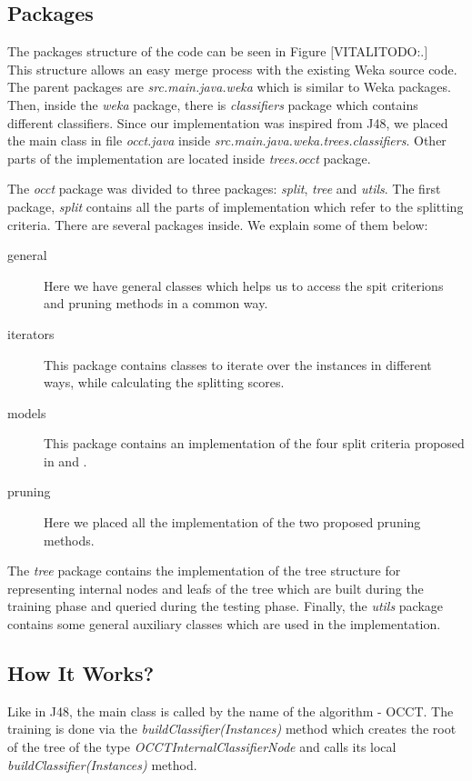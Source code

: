 \documentclass[a4paper,12pt]{article}
\newcommand{\commenter}[3]{$[$\uppercase{#1}#2:#3$]$  \\}
\newcommand{\vitali}[2]{\commenter{vitali}{#1}{#2}}
\begin{document}
\begin{spacing}{1.5}
\subsection{Packages}
The packages structure of the code can be seen in Figure \vitali{TODO}. This structure allows an easy merge process with the existing Weka source code. The parent packages are {\em src.main.java.weka} which is similar to Weka packages. Then, inside the {\em weka} package, there is {\em classifiers} package which contains different classifiers. Since our implementation was inspired from J48, we placed the main class in file {\em occt.java} inside {\em src.main.java.weka.trees.classifiers}. Other parts of the implementation are located inside {\em trees.occt} package.

The {\em occt} package was divided to three packages: {\em split}, {\em tree} and {\em utils}. The first package, {\em split} contains all the parts of implementation which refer to the splitting criteria. There are several packages inside. We explain some of them below:
\begin{description}
  \item[general] Here we have general classes which helps us to access the spit criterions and pruning methods in a common way.
  \item[iterators] This package contains classes to iterate over the instances in different ways, while calculating the splitting scores.
  \item[models] This package contains an implementation of the four split criteria proposed in \cite{dror2011thesis} and \cite{dror2014occt}.
  \item[pruning] Here we placed all the implementation of the two proposed pruning methods.
\end{description}
The {\em tree} package contains the implementation of the tree structure for representing internal nodes and leafs of the tree which are built during the training phase and queried during the testing phase. Finally, the {\em utils} package contains some general auxiliary classes which are used in the implementation.

\subsection{How It Works?}
Like in J48, the main class is called by the name of the algorithm - OCCT. The training is done via the {\em buildClassifier(Instances)} method which creates the root of the tree of the type {\em OCCTInternalClassifierNode} and calls its local {\em buildClassifier(Instances)} method.


\end{spacing}
\end{document}
